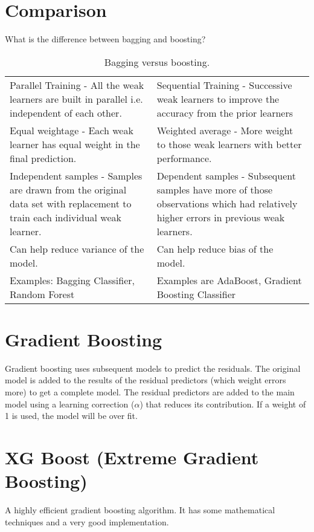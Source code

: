 	\section{Comparison}
What is the difference between bagging and boosting?

	\begin{table}
        \centering
        \caption[Bagging versus boosting]{Bagging versus boosting.}
        \label{tab:baggingversusboosting}
		\begin{tabularx}{\linewidth}{|L|L|} \hline
			 &  \\ \hline
			Parallel Training - All the weak learners are built in parallel i.e. independent of each other. &
			Sequential Training - Successive weak learners to improve the accuracy from the prior learners \\ \hline
			Equal weightage - Each weak learner has equal weight in the final prediction. &
			Weighted average - More weight to those weak learners with better performance. \\ \hline
			Independent samples - Samples are drawn from the original data set with replacement to train each individual weak learner. &
			Dependent samples - Subsequent samples have more of those observations which had relatively higher errors in previous weak learners. \\ \hline
			Can help reduce variance of the model. &
			Can help reduce bias of the model. \\ \hline
			Examples: Bagging Classifier, Random Forest &
			Examples are AdaBoost, Gradient Boosting Classifier \\ \hline
		\end{tabularx}
	\end{table}

	\section{Gradient Boosting}
Gradient boosting uses subsequent models to predict the residuals.  The original model is added to the results of the residual predictors (which weight errors more) to get a complete model.  The residual predictors are added to the main model using a learning correction ($\alpha$) that reduces its contribution.  If a weight of 1 is used, the model will be over fit.

	\section{XG Boost (Extreme Gradient Boosting)}
A highly efficient gradient boosting algorithm.  It has some mathematical techniques and a very good implementation.

